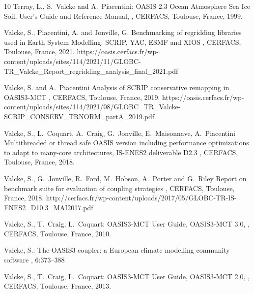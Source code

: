 \begin{thebibliography}{10}
Terray, L., S.~Valcke and A.~Piacentini:
\newblock OASIS 2.3 Ocean Atmosphere Sea Ice Soil, User's Guide and
Reference Manual,
,
\newblock CERFACS, Toulouse, France, 1999.

Valcke, S., Piacentini, A. and Jonville, G.
\newblock Benchmarking of regridding libraries used in Earth System
Modelling: SCRIP, YAC, ESMF and XIOS
,
\newblock CERFACS, Toulouse, France, 2021.
\newblock https://oasis.cerfacs.fr/wp-content/uploads/sites/114/2021/11/GLOBC-TR\_Valcke\_Report\_regridding\_analysis\_final\_2021.pdf

Valcke, S. and A.~Piacentini
\newblock Analysis of SCRIP conservative remapping in OASIS3-MCT
,
\newblock CERFACS, Toulouse, France, 2019.
\newblock https://oasis.cerfacs.fr/wp-content/uploads/sites/114/2021/08/GLOBC\_TR\_Valcke-SCRIP\_CONSERV\_TRNORM\_partA\_2019.pdf

Valcke, S., L.~Coquart, A.~Craig, G.~Jonville, E.~Maisonnave, A.~Piacentini
\newblock Multithreaded or thread safe OASIS version including performance optimizations to adapt to many-core architectures, IS-ENES2 deliverable D2.3
,
\newblock CERFACS, Toulouse, France, 2018.

Valcke, S., G.~Jonville, R.~Ford, M.~Hobson, A.~Porter and G.~Riley
\newblock Report on benchmark suite for evaluation of coupling strategies
,
\newblock CERFACS, Toulouse, France, 2018.
\newblock http://cerfacs.fr/wp-content/uploads/2017/05/GLOBC-TR-IS-ENES2\_D10.3\_MAI2017.pdf

Valcke, S., T.~Craig, L.~Coquart:
\newblock OASIS3-MCT User Guide, OASIS3-MCT 3.0,
,
\newblock CERFACS, Toulouse, France, 2010.

Valcke, S.:
\newblock The OASIS3 coupler: a European climate modelling community software
, 6:373--388

Valcke, S., T.~Craig, L.~Coquart:
\newblock OASIS3-MCT User Guide, OASIS3-MCT 2.0,
,
\newblock CERFACS, Toulouse, France, 2013.


\end{thebibliography}
